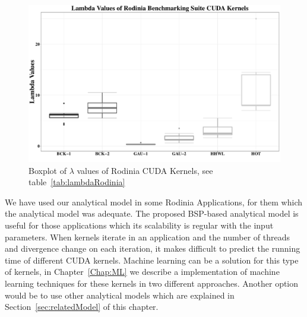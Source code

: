 \begin{figure}[htpb]
\centering
 \includegraphics[scale=.3]{images/LambdaAnalyticalModel-Rodinia.pdf}
\caption{Boxplot of $\lambda$ values of Rodinia CUDA Kernels, see table~\ref{tab:lambdaRodinia}}
\label{fig:LambdaRodinia}
\end{figure}

We have used our analytical model in some Rodinia Applications, for them which the analytical model was adequate. The proposed BSP-based analytical model is useful for those applications which its scalability is regular with the input parameters. When kernels iterate in an application and the number of threads and divergence change on each iteration, it makes difficult to predict the running time of different CUDA kernels. Machine learning can be a solution for this type of kernels, in Chapter~\ref{Chap:ML} we describe a implementation of machine learning techniques for these kernels in two different approaches. Another option would be to use other analytical models which are explained in Section~\ref{sec:relatedModel} of this chapter.


